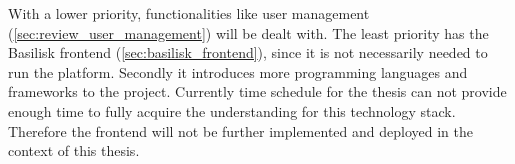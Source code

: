 With a lower priority, functionalities like user management (\ref{sec:review_user_management}) will be dealt with.
The least priority has the Basilisk frontend (\ref{sec:basilisk_frontend}), since it is not necessarily needed to run the platform.
Secondly it introduces more programming languages and frameworks to the project.
Currently time schedule for the thesis can not provide enough time to fully acquire the understanding for this technology stack.
Therefore the frontend will not be further implemented and deployed in the context of this thesis.









	